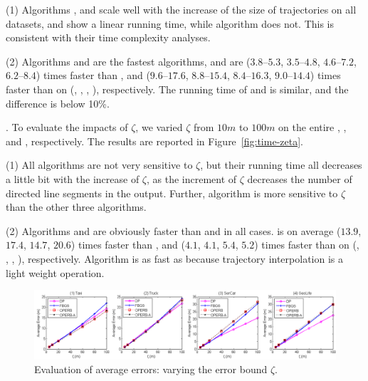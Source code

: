 \sstab(1) Algorithms \operb, \operba and \fbqsa  scale well with the increase of the size of trajectories on all datasets,
and show a linear running time, while algorithm \dpa does not.
This is consistent with their time complexity analyses.

\sstab(2) Algorithms \operb and \operba are the fastest \lsa algorithms, and are {($3.8$--$5.3$, $3.5$--$4.8$, $4.6$--$7.2$, $6.2$--$8.4$)} times faster than \fbqsa,
and {($9.6$--$17.6$, $8.8$--$15.4$, $8.4$--$16.3$, $9.0$--$14.4$)} times faster than \dpa on (\taxi, \truck, \sercar, \geolife), respectively. The running time of \operb and \operba is similar, and the difference is below 10\%.

.
To evaluate the impacts of $\zeta$, we varied $\zeta$ from $10m$ to $100m$ on the entire \taxi, \truck, \sercar and \geolife, respectively.
The results are reported in Figure~\ref{fig:time-zeta}.


\sstab(1) All algorithms are not very sensitive to $\zeta$, but their running time all decreases a little bit with the increase of $\zeta$,
as the increment of $\zeta$ decreases the number of directed line segments in the output.
Further, algorithm \dpa is more sensitive to $\zeta$ than the other three algorithms.

\sstab(2) Algorithms \operb and \operba are obviously faster than \dpa and \fbqsa in all cases.
\operb is on average ($13.9$, $17.4$, $14.7$, {$20.6$}) times faster than \dpa, and ($4.1$, $4.1$, $5.4$, {$5.2$}) times faster than \fbqsa on (\taxi, \truck, \sercar, {\geolife}), respectively. Algorithm \operba is as fast as \operb because trajectory interpolation is a light weight operation.







\begin{figure}[tb]
\centering
\includegraphics[scale = 0.465]{figures/exp-averageerror.png}
\vspace{-2ex}
\caption{\small Evaluation of average errors: varying the error bound $\zeta$.}
\label{fig:ae}
\vspace{-2ex}
\end{figure}


